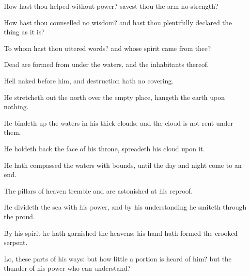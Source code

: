 {How hast thou
helped
{} without
power?
{}
savest thou the
arm
{}
no
strength?

How hast thou
counselled
{}
no
wisdom? and
{} hast thou
plentifully
declared the thing as it
is?

To whom hast thou
uttered
words? and whose
spirit
came from thee?


\par }{\PP {}Dead
{} are
formed from under the
waters, and the
inhabitants thereof.

Hell
{}
naked before him, and
destruction hath no
covering.

He stretcheth
out the
north over the empty
place,
{}
hangeth the
earth upon
nothing.

He bindeth
up the
waters in his thick
clouds; and the
cloud is not
rent under them.

He holdeth
back the
face of his
throne,
{}
spreadeth his
cloud upon it.

He hath
compassed the
waters with
bounds, until the
day and
night come to an
end.

The
pillars of
heaven
tremble and are
astonished at his
reproof.

He
divideth the
sea with his
power, and by his
understanding he
smiteth through the
proud.

By his
spirit he hath
garnished the
heavens; his
hand hath
formed the
crooked
serpent.

Lo, these
{}
parts of his
ways: but how
little a
portion is
heard of him? but the
thunder of his
power who can
understand?




\par }
